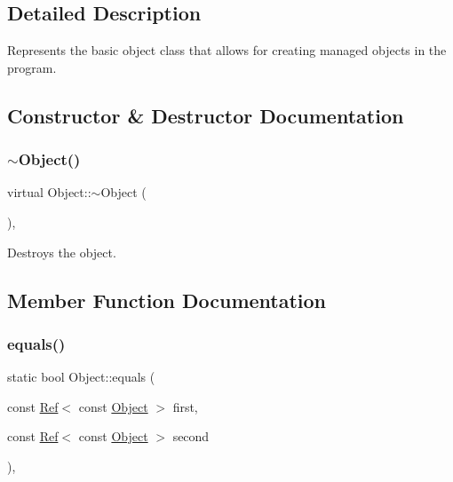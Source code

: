 \subsection{Detailed Description}
Represents the basic object class that allows for creating managed objects in the program. 



\subsection{Constructor \& Destructor Documentation}
\mbox{\label{class_object_aa3e791419d84c4c346ef9499513b8e00}} 
\subsubsection{\texorpdfstring{$\sim$Object()}{~Object()}}
{\footnotesize\ttfamily virtual Object\+::$\sim$\+Object (\begin{DoxyParamCaption}{ }\end{DoxyParamCaption})\hspace{0.3cm}{\ttfamily [inline]}, {\ttfamily [virtual]}}



Destroys the object. 



\subsection{Member Function Documentation}
\mbox{\label{class_object_a0e9be30be18b9cc7db1e6788c6b8599f}} 
\subsubsection{\texorpdfstring{equals()}{equals()}\hspace{0.1cm}{\footnotesize\ttfamily [1/2]}}
{\footnotesize\ttfamily static bool Object\+::equals (\begin{DoxyParamCaption}\item[{const \mbox{\hyperlink{class_ref}{Ref}}$<$ const \mbox{\hyperlink{class_object}{Object}} $>$}]{first,  }\item[{const \mbox{\hyperlink{class_ref}{Ref}}$<$ const \mbox{\hyperlink{class_object}{Object}} $>$}]{second }\end{DoxyParamCaption})\hspace{0.3cm}{\ttfamily [inline]}, {\ttfamily [static]}}



